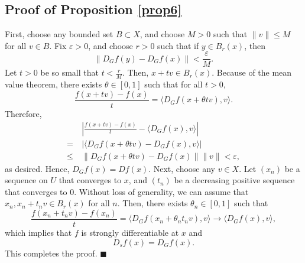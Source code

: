 \documentclass[a4paper,12pt]{article}
\theoremstyle{definition}
\begin{document}
\subsection{Proof of Proposition \ref{prop6}}
First, choose any bounded set $B\subset X$, and choose $M>0$ such that $\|v\|\le M$ for all $v\in B$. Fix $\varepsilon>0$, and choose $r>0$ such that if $y\in B_r(x)$, then
\[\|D_Gf(y)-D_Gf(x)\|<\frac{\varepsilon}{M}.\]
Let $t>0$ be so small that $t<\frac{r}{M}$. Then, $x+tv\in B_r(x)$. Because of the mean value theorem, there exists $\theta\in [0,1]$ such that for all $t>0$,
\[\frac{f(x+tv)-f(x)}{t}=\langle D_Gf(x+\theta tv),v\rangle.\]
Therefore,
\begin{align*}
&~\left|\frac{f(x+tv)-f(x)}{t}-\langle D_Gf(x),v\rangle\right|\\
=&~|\langle D_Gf(x+\theta tv)-D_Gf(x),v\rangle|\\
\le&~\|D_Gf(x+\theta tv)-D_Gf(x)\|\|v\|<\varepsilon,
\end{align*}
as desired. Hence, $D_Gf(x)=Df(x)$. Next, choose any $v\in X$. Let $(x_n)$ be a sequence on $U$ that converges to $x$, and $(t_n)$ be a decreasing positive sequence that converges to $0$. Without loss of generality, we can assume that $x_n,x_n+t_nv\in B_r(x)$ for all $n$. Then, there exists $\theta_n\in [0,1]$ such that
\[\frac{f(x_n+t_nv)-f(x_n)}{t}=\langle D_Gf(x_n+\theta_nt_nv),v\rangle\to \langle D_Gf(x),v\rangle,\]
which implies that $f$ is strongly differentiable at $x$ and
\[D_sf(x)=D_Gf(x).\]
This completes the proof. $\blacksquare$
\end{document}
